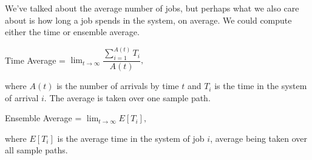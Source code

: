 We've talked about the average number of jobs, but perhaps what we also care about is how long a job spends in the system, on average. We could compute either the time or ensemble average. 

\begin{center}
	Time Average = $\lim_{t\to\infty}\dfrac{\sum_{i=1}^{A(t)} T_{i}}{A(t)},$
\end{center}

where $A(t)$ is the number of arrivals by time $t$ and $T_{i}$ is the time in the system of arrival $i$. The average is taken over one sample path.

\begin{center}
	Ensemble Average = $\lim_{t\to\infty}E[T_{i}],$
\end{center}

where $E[T_{i}]$ is the average time in the system of job $i$, average being taken over all sample paths.




